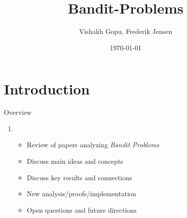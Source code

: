 \documentclass{beamer}
\title{Bandit-Problems}
\date{\today}
\author{Vishakh Gopu, Frederik Jensen}
\institute{Advanced machine learning}
\begin{document}
  \maketitle
  \section{Introduction}

 \begin{frame}{Overview}
   
   \begin{enumerate}
    \item
      \begin{itemize}

      \item
       Review of papers analyzing \textit{Bandit Problems}
      \item
       Discuss main ideas and concepts 
      \item
       Discuss key results and connections
     \item
       New analysis/proofs/implementation
     \item
       Open questions and future directions
      \end{itemize}
    \end{enumerate}
  \end{frame}
\end{document}
